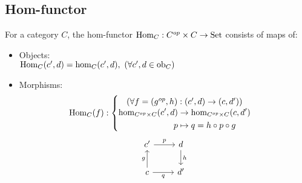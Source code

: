\subsection*{Hom-functor}
For a category $C$, the hom-functor $\mathrm{Hom}_C : C^{op}\times C \to
\mathrm{Set}$ consists of maps of: \parencite{maclane:working_mathematician}
\begin{itemize}
  \item Objects:\\
    $\mathrm{Hom}_C (c', d) = \hom_C (c', d),
      \ (\forall c', d\in \mathrm{ob}_C)$
  \item Morphisms:
    \[
      \Hom_C (f) :
      \begin{cases}
        \hfil(\forall f=(g^{op}, h): (c', d)\to (c, d'))\\
        \begin{aligned}
          \hom_{C^{op}\times C}(c', d) &\to
            \hom_{C^{op}\times C}(c, d')\\
          p &\mapsto q = h\circ p\circ g
        \end{aligned}
      \end{cases}
    \]
    \[
      \begin{tikzcd}
      {c'} & d \\
      c & {d'}
      \arrow["g", from=2-1, to=1-1]
      \arrow["h", from=1-2, to=2-2]
      \arrow["p", from=1-1, to=1-2]
      \arrow["q"', from=2-1, to=2-2]
      \end{tikzcd}
    \]
\end{itemize}